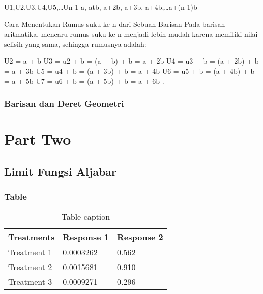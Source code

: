 \documentclass[11pt,fleqn]{book} %
\begin{document}
U1,U2,U3,U4,U5,…Un-1
a, atb, a+2b, a+3b, a+4b,…a+(n-1)b

Cara Menentukan Rumus suku ke-n dari Sebuah Barisan
Pada barisan aritmatika, mencaru rumus suku ke-n menjadi lebih mudah karena memiliki nilai selisih yang sama, sehingga rumusnya adalah:

U2 = a + b
U3 = u2 + b = (a + b) + b = a + 2b
U4 = u3 + b = (a + 2b) + b = a + 3b
U5 = u4 + b = (a + 3b) + b = a + 4b
U6 = u5 + b = (a + 4b) + b = a + 5b
U7 = u6 + b = (a + 5b) + b = a + 6b
.
\section{Barisan dan Deret Geometri}


\part{Part Two}



\chapter{Limit Fungsi Aljabar}

\section{Table}

\begin{table}[h]
\centering
\begin{tabular}{l l l}
\toprule
\textbf{Treatments} & \textbf{Response 1} & \textbf{Response 2}\\
\midrule
Treatment 1 & 0.0003262 & 0.562 \\
Treatment 2 & 0.0015681 & 0.910 \\
Treatment 3 & 0.0009271 & 0.296 \\
\bottomrule
\end{tabular}
\caption{Table caption}
\end{table}
\end{document}
